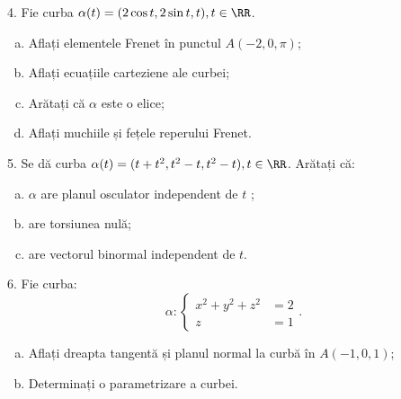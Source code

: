 4. Fie curba $ \alpha(t) = (2 \cos t, 2 \sin t, t), t \in \RR $.
\begin{enumerate}[(a)]
  \item Aflați elementele Frenet în punctul $ A(-2, 0, \pi) $;
  \item Aflați ecuațiile carteziene ale curbei;
  \item Arătați că $ \alpha $ este o elice;
  \item Aflați muchiile și fețele reperului Frenet.
\end{enumerate}

\vspace{1cm}

5. Se dă curba $ \alpha(t) = (t + t^2, t^2 - t, t^2 - t), t \in \RR $.
Arătați că:
\begin{enumerate}[(a)]
  \item $ \alpha $ are planul osculator independent de $ t $ ;
  \item are torsiunea nulă;
  \item are vectorul binormal independent de $ t $.
\end{enumerate}

\vspace{1cm}

6. Fie curba:
\[
  \alpha : \begin{cases}
    x^2 + y^2 + z^2 &= 2  \\
    z &= 1
  \end{cases}.
\]

\begin{enumerate}[(a)]
  \item Aflați dreapta tangentă și planul normal la curbă în $ A(-1, 0, 1) $;
  \item Determinați o parametrizare a curbei.
\end{enumerate}


